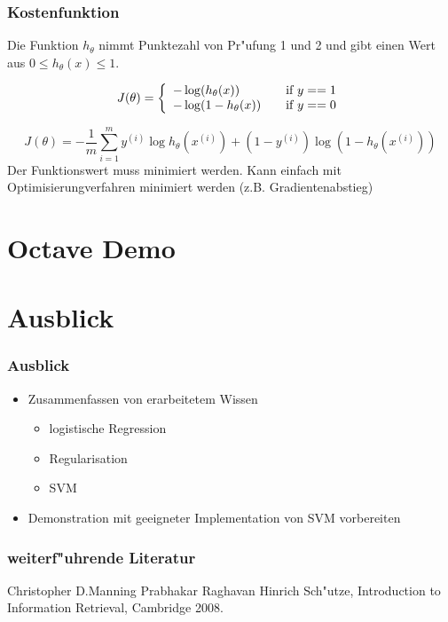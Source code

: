 \documentclass{beamer}
\begin{document}
\begin{frame}
  \frametitle{Kostenfunktion}

Die Funktion $h_{\theta}$ nimmt Punktezahl von Pr"ufung 1 und 2 und gibt einen Wert aus $0 \leq h_{\theta}(x) \leq 1$.

\[
J(\theta) = \left \{
\begin{array}{l l}
  -\log(h_{\theta} (x)) & \quad \text{if $y==1$}\\
  -\log(1-h_{\theta} (x)) & \quad \text{if $y==0$}
\end{array} \right.
\]

\[
J( \theta ) = - \frac{1}{m} \sum_{i=1}^m y^{(i)} \log h_{\theta}(x^{(i)}) + (1 - y^{(i)}) \log(1 - h_{\theta}(x^{(i)}))
\]
Der Funktionswert muss minimiert werden. Kann einfach mit Optimisierungverfahren minimiert werden (z.B. Gradientenabstieg)

\end{frame}

\section{Octave Demo}


\section{Ausblick}
\begin{frame}
  \frametitle{Ausblick}
  \begin{itemize}
  \item Zusammenfassen von erarbeitetem Wissen
    \begin{itemize}
    \item logistische Regression
    \item Regularisation
      \item SVM
    \end{itemize}
  \item Demonstration mit geeigneter Implementation von SVM vorbereiten
  \end{itemize}
\end{frame}
 

\begin{frame}
  \frametitle{weiterf"uhrende Literatur}

\begin{thebibliography}{Subramaniam, 2011}

Christopher D.Manning Prabhakar Raghavan Hinrich Sch"utze,
Introduction to Information Retrieval,
Cambridge
2008.

\end{thebibliography}
\end{frame}
\end{document}
